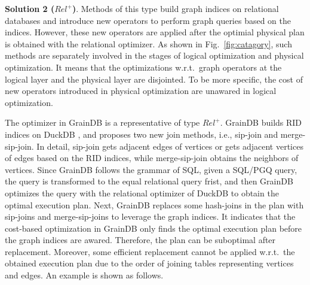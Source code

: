 \textbf{Solution 2 ($Rel^+$)}.
Methods of this type build graph indices on relational databases and introduce new operators to perform graph queries based on the indices.
However, these new operators are applied after the optimial physical plan is obtained with the relational optimizer.
As shown in Fig.~\ref{fig:catagory}, such methods are separately involved in the stages of logical optimization and physical optimization.
It means that the optimizations w.r.t.~graph operators at the logical layer and the physical layer are disjointed.
To be more specific, the cost of new operators introduced in physical optimization are unawared in logical optimization.

The optimizer in GrainDB \cite{graindb} is a representative of type $Rel^+$.
GrainDB builds RID indices on DuckDB \cite{duckdb}, and proposes two new join methods, i.e., sip-join and merge-sip-join.
In detail, sip-join gets adjacent edges of vertices or gets adjacent vertices of edges based on the RID indices, while merge-sip-join obtains the neighbors of vertices.
Since GrainDB follows the grammar of SQL, given a SQL/PGQ query, the query is transformed to the equal relational query frist, and then GrainDB optimizes the query with the relational optimizer of DuckDB to obtain the optimal execution plan.
Next, GrainDB replaces some hash-joins in the plan with sip-joins and merge-sip-joins to leverage the graph indices.
It indicates that the cost-based optimization in GrainDB only finds the optimal execution plan before the graph indices are awared.
Therefore, the plan can be suboptimal after replacement.
Moreover, some efficient replacement cannot be applied w.r.t.~the obtained execution plan due to the order of joining tables representing vertices and edges.
An example is shown as follows.

